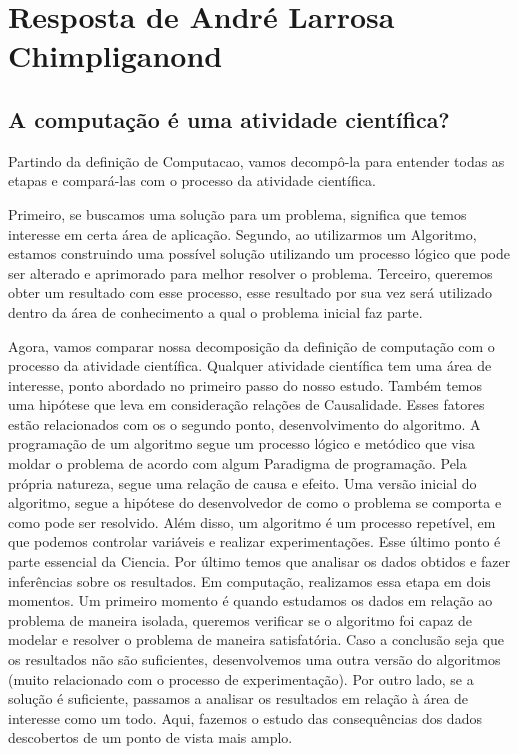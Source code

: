 \section{Resposta de André Larrosa Chimpliganond}




\subsection{A computação é uma atividade científica?}

Partindo da definição de \gls{Computacao}, vamos decompô-la para entender todas as etapas e compará-las com o processo da atividade científica.

Primeiro, se buscamos uma solução para um problema, significa que temos interesse em certa área de aplicação. Segundo, ao utilizarmos um \gls{Algoritmo}, estamos construindo uma possível solução utilizando um processo lógico que pode ser alterado e aprimorado para melhor resolver o problema. Terceiro, queremos obter um resultado com esse processo, esse resultado por sua vez será utilizado dentro da área de conhecimento a qual o problema inicial faz parte.

Agora, vamos comparar nossa decomposição da definição de computação com o processo da atividade científica. Qualquer atividade científica tem uma área de interesse, ponto abordado no primeiro passo do nosso estudo. Também temos uma hipótese que leva em consideração relações de \gls{Causalidade}. Esses fatores estão relacionados com os o segundo ponto, desenvolvimento do algoritmo. A programação de um algoritmo segue um processo lógico e metódico que visa moldar o problema de acordo com algum \gls{Paradigma} de programação. Pela própria natureza, segue uma relação de causa e efeito. Uma versão inicial do algoritmo, segue a hipótese do desenvolvedor de como o problema se comporta e como pode ser resolvido. Além disso, um algoritmo é um processo repetível, em que podemos controlar variáveis e realizar experimentações. Esse último ponto é parte essencial da \gls{Ciencia}. Por último temos que analisar os dados obtidos e fazer inferências sobre os resultados. Em computação, realizamos essa etapa em dois momentos. Um primeiro momento é quando estudamos os dados em relação ao problema de maneira isolada, queremos verificar se o algoritmo foi capaz de modelar e resolver o problema de maneira satisfatória. Caso a conclusão seja que os resultados não são suficientes, desenvolvemos uma outra versão do algoritmos (muito relacionado com o processo de experimentação). Por outro lado, se a solução é suficiente, passamos a analisar os resultados em relação à área de interesse como um todo. Aqui, fazemos o estudo das consequências dos dados descobertos de um ponto de vista mais amplo.

